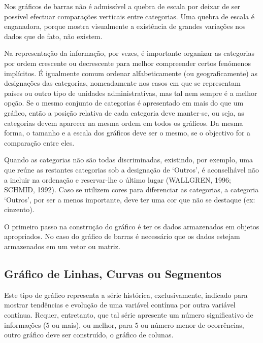 Nos gráficos de barras não é admissível a quebra de escala por deixar de ser possível efectuar comparações verticais entre categorias. Uma quebra de escala é enganadora, porque mostra visualmente a existência de grandes variações nos dados que de fato, não existem.\vskip0.3cm 

Na representação da informação, por vezes, é importante organizar as categorias por ordem crescente ou decrescente para melhor compreender certos fenómenos implícitos. É igualmente comum ordenar alfabeticamente (ou geograficamente) as designações das categorias, nomeadamente nos casos em que se representam países ou outro tipo de unidades administrativas, mas tal nem sempre é a melhor opção. Se o mesmo conjunto de categorias é apresentado em mais do que um gráfico, então a posição relativa de cada categoria deve manter-se, ou seja, as categorias devem aparecer na mesma ordem em todos os gráficos. Da mesma forma, o tamanho e a escala dos gráficos deve ser o mesmo, se o objectivo for a comparação entre eles. \vskip0.3cm  

Quando as categorias não são todas discriminadas, existindo, por exemplo, uma que reúne as restantes categorias sob a designação de ‘Outros’, é aconselhável não a incluir na ordenação e reservar-lhe o último lugar (WALLGREN, 1996; SCHMID, 1992). Caso se utilizem cores para diferenciar as categorias, a categoria ‘Outros’, por ser a menos importante, deve ter uma cor que não se destaque (ex: cinzento). \vskip0.3cm

\inic O primeiro passo na construção do gráfico é ter os dados armazenados em objetos apropriados. No caso do gráfico de barras é necessário que os dados estejam armazenados em um vetor ou matriz.







\subsection{Gráfico de Linhas, Curvas ou Segmentos}

Este tipo de gráfico representa a série histórica, exclusivamente,
indicado para mostrar tendências e evolução de uma variável
contínua por outra variável contínua. Requer, entretanto, que tal
série apresente um número significativo de informações (5 ou
mais), ou melhor, para 5 ou número menor de ocorrências, outro
gráfico deve ser construído, o gráfico de colunas.\vskip0.3cm

